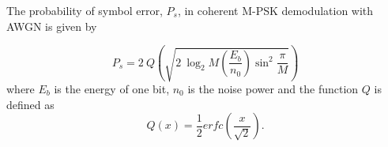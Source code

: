 %
%
%
%
%
%
%
%
%
%
%

The probability of symbol error, $P_s$, in coherent M-PSK demodulation with AWGN is given by 

\begin{equation}
	P_s=2~Q\left(\sqrt{2~\log_2 M \left(\frac{E_b}{n_0}\right)\sin^2\frac{\pi}{M}}\right)
\end{equation}
where $E_b$ is the energy of one bit, $n_0$ is the noise power and the function $Q$ is defined as
\begin{equation}
	Q(x)=\frac{1}{2} erfc\left(\frac{x}{\sqrt{2}}\right).
	\label{eq:Ps}
\end{equation}

